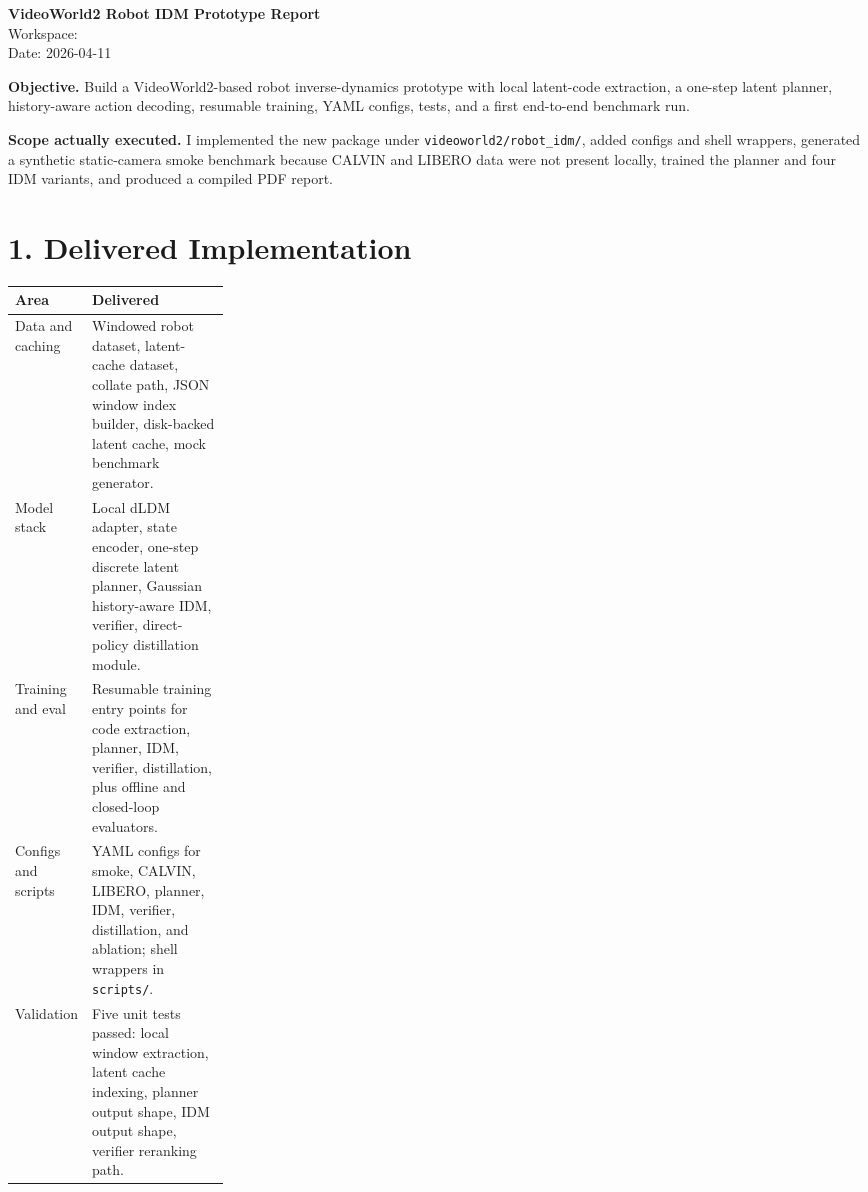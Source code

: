 \documentclass[11pt]{article}
\newcommand{\code}[1]{\texttt{#1}}
\begin{document}
{\LARGE \textbf{VideoWorld2 Robot IDM Prototype Report}}\\[0.25em]
{\small Workspace: }\\[0.15em]
{\large Date: 2026-04-11}

\vspace{0.8em}

\textbf{Objective.}
Build a VideoWorld2-based robot inverse-dynamics prototype with local latent-code extraction, a one-step latent planner, history-aware action decoding, resumable training, YAML configs, tests, and a first end-to-end benchmark run.

\textbf{Scope actually executed.}
I implemented the new package under \code{videoworld2/robot\_idm/}, added configs and shell wrappers, generated a synthetic static-camera smoke benchmark because CALVIN and LIBERO data were not present locally, trained the planner and four IDM variants, and produced a compiled PDF report.

\section*{1. Delivered Implementation}

\begin{tabularx}{\linewidth}{>{\raggedright\arraybackslash}p{0.25\linewidth} >{\raggedright\arraybackslash}X}
\toprule
\textbf{Area} & \textbf{Delivered} \\
\midrule
Data and caching & Windowed robot dataset, latent-cache dataset, collate path, JSON window index builder, disk-backed latent cache, mock benchmark generator. \\
Model stack & Local dLDM adapter, state encoder, one-step discrete latent planner, Gaussian history-aware IDM, verifier, direct-policy distillation module. \\
Training and eval & Resumable training entry points for code extraction, planner, IDM, verifier, distillation, plus offline and closed-loop evaluators. \\
Configs and scripts & YAML configs for smoke, CALVIN, LIBERO, planner, IDM, verifier, distillation, and ablation; shell wrappers in \code{scripts/}. \\
Validation & Five unit tests passed: local window extraction, latent cache indexing, planner output shape, IDM output shape, verifier reranking path. \\
\bottomrule
\end{tabularx}
\end{document}
